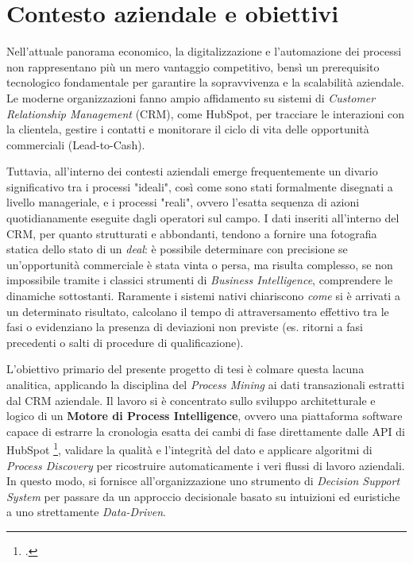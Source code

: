 \documentclass[12pt, a4paper]{report}
\begin{document}
\section*{Contesto aziendale e obiettivi}
Nell'attuale panorama economico, la digitalizzazione e l'automazione dei processi non rappresentano più un mero vantaggio competitivo, bensì un prerequisito tecnologico fondamentale per garantire la sopravvivenza e la scalabilità aziendale. Le moderne organizzazioni fanno ampio affidamento su sistemi di \textit{Customer Relationship Management} (CRM), come HubSpot, per tracciare le interazioni con la clientela, gestire i contatti e monitorare il ciclo di vita delle opportunità commerciali (Lead-to-Cash). 

Tuttavia, all'interno dei contesti aziendali emerge frequentemente un divario significativo tra i processi "ideali", così come sono stati formalmente disegnati a livello manageriale, e i processi "reali", ovvero l'esatta sequenza di azioni quotidianamente eseguite dagli operatori sul campo. I dati inseriti all'interno del CRM, per quanto strutturati e abbondanti, tendono a fornire una fotografia statica dello stato di un \textit{deal}: è possibile determinare con precisione se un'opportunità commerciale è stata vinta o persa, ma risulta complesso, se non impossibile tramite i classici strumenti di \textit{Business Intelligence}, comprendere le dinamiche sottostanti. Raramente i sistemi nativi chiariscono \textit{come} si è arrivati a un determinato risultato, calcolano il tempo di attraversamento effettivo tra le fasi o evidenziano la presenza di deviazioni non previste (es. ritorni a fasi precedenti o salti di procedure di qualificazione).

L'obiettivo primario del presente progetto di tesi è colmare questa lacuna analitica, applicando la disciplina del \textit{Process Mining} ai dati transazionali estratti dal CRM aziendale. Il lavoro si è concentrato sullo sviluppo architetturale e logico di un \textbf{Motore di Process Intelligence}, ovvero una piattaforma software capace di estrarre la cronologia esatta dei cambi di fase direttamente dalle API di HubSpot \footcite{hubspot_api}, validare la qualità e l'integrità del dato e applicare algoritmi di \textit{Process Discovery} per ricostruire automaticamente i veri flussi di lavoro aziendali. In questo modo, si fornisce all'organizzazione uno strumento di \textit{Decision Support System} per passare da un approccio decisionale basato su intuizioni ed euristiche a uno strettamente \textit{Data-Driven}.
\end{document}
